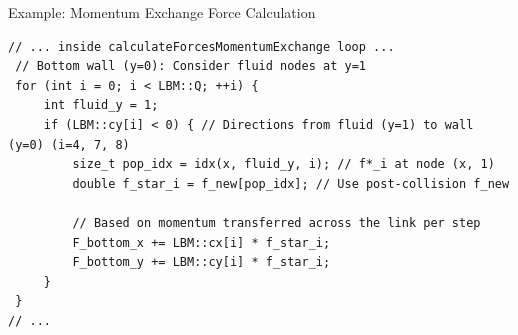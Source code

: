 \documentclass[11pt, a4paper]{article}
\begin{document}
Example: Momentum Exchange Force Calculation
\begin{lstlisting}[caption={Momentum Exchange Force Calculation in Simulation::calculateForcesMomentumExchange (Excerpt for Bottom Wall)}, label={lst:me_force}]
// ... inside calculateForcesMomentumExchange loop ...
 // Bottom wall (y=0): Consider fluid nodes at y=1
 for (int i = 0; i < LBM::Q; ++i) {
     int fluid_y = 1;
     if (LBM::cy[i] < 0) { // Directions from fluid (y=1) to wall (y=0) (i=4, 7, 8)
         size_t pop_idx = idx(x, fluid_y, i); // f*_i at node (x, 1)
         double f_star_i = f_new[pop_idx]; // Use post-collision f_new

         // Based on momentum transferred across the link per step
         F_bottom_x += LBM::cx[i] * f_star_i;
         F_bottom_y += LBM::cy[i] * f_star_i;
     }
 }
// ...
\end{lstlisting}
\end{document}
